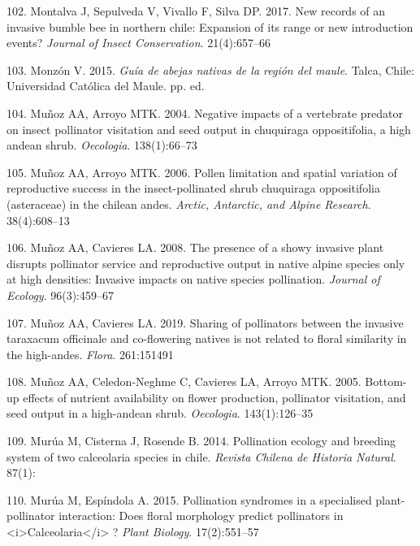 \documentclass[
]{article}
\begin{document}
\leavevmode\hypertarget{ref-RN54}{}%
102. Montalva J, Sepulveda V, Vivallo F, Silva DP. 2017. New records of
an invasive bumble bee in northern chile: Expansion of its range or new
introduction events? \emph{Journal of Insect Conservation}.
21(4):657--66

\leavevmode\hypertarget{ref-RN88}{}%
103. Monzón V. 2015. \emph{Guía de abejas nativas de la región del
maule}. Talca, Chile: Universidad Católica del Maule. pp. ed.

\leavevmode\hypertarget{ref-RN138}{}%
104. Muñoz AA, Arroyo MTK. 2004. Negative impacts of a vertebrate
predator on insect pollinator visitation and seed output in chuquiraga
oppositifolia, a high andean shrub. \emph{Oecologia}. 138(1):66--73

\leavevmode\hypertarget{ref-RN139}{}%
105. Muñoz AA, Arroyo MTK. 2006. Pollen limitation and spatial variation
of reproductive success in the insect-pollinated shrub chuquiraga
oppositifolia (asteraceae) in the chilean andes. \emph{Arctic,
Antarctic, and Alpine Research}. 38(4):608--13

\leavevmode\hypertarget{ref-RN140}{}%
106. Muñoz AA, Cavieres LA. 2008. The presence of a showy invasive plant
disrupts pollinator service and reproductive output in native alpine
species only at high densities: Invasive impacts on native species
pollination. \emph{Journal of Ecology}. 96(3):459--67

\leavevmode\hypertarget{ref-RN4}{}%
107. Muñoz AA, Cavieres LA. 2019. Sharing of pollinators between the
invasive taraxacum officinale and co-flowering natives is not related to
floral similarity in the high-andes. \emph{Flora}. 261:151491

\leavevmode\hypertarget{ref-RN141}{}%
108. Muñoz AA, Celedon-Neghme C, Cavieres LA, Arroyo MTK. 2005.
Bottom-up effects of nutrient availability on flower production,
pollinator visitation, and seed output in a high-andean shrub.
\emph{Oecologia}. 143(1):126--35

\leavevmode\hypertarget{ref-RN144}{}%
109. Murúa M, Cisterna J, Rosende B. 2014. Pollination ecology and
breeding system of two calceolaria species in chile. \emph{Revista
Chilena de Historia Natural}. 87(1):

\leavevmode\hypertarget{ref-RN55}{}%
110. Murúa M, Espíndola A. 2015. Pollination syndromes in a specialised
plant-pollinator interaction: Does floral morphology predict pollinators
in \textless i\textgreater Calceolaria\textless/i\textgreater{} ?
\emph{Plant Biology}. 17(2):551--57
\end{document}
